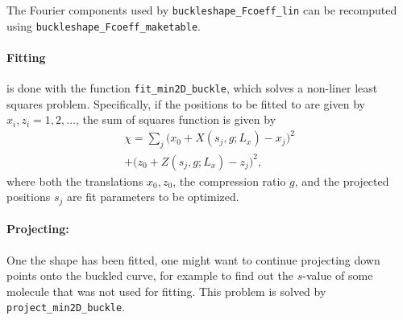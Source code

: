 \documentclass[11pt,a4paper,twocolumn]{article}
\begin{document}
The Fourier components used by \texttt{buckleshape\_Fcoeff\_lin} can
be recomputed using \texttt{buckleshape\_Fcoeff\_maketable}.

\paragraph{Fitting}
is done with the function \texttt{fit\_min2D\_buckle}, which solves a
non-liner least squares problem. Specifically, if the positions to be
fitted to are given by $x_i,z_i=1,2,\ldots$, the sum of squares
function is given by
\begin{multline}
    \chi=\sum_j
    \big(x_0+X(s_j,g;L_x)-x_j\big)^2\\
   +\big(z_0+Z(s_j,g;L_x)-z_j\big)^2,
\end{multline}
where both the translations $x_0,z_0$, the compression ratio $g$, and
the projected positions $s_j$ are fit parameters to be optimized.
\paragraph{Projecting:}
One the shape has been fitted, one might want to continue projecting
down points onto the buckled curve, for example to find out the
$s$-value of some molecule that was not used for fitting. This problem
is solved by \texttt{project\_min2D\_buckle}.

 

\end{document}
